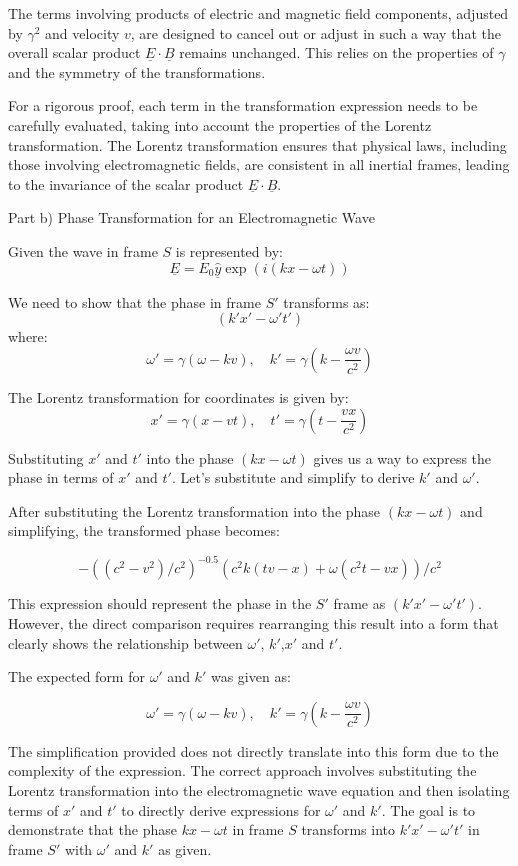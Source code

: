 The terms involving products of electric and magnetic field components, adjusted by \(\gamma^2\) and velocity \(v\), are designed to cancel out or adjust in such a way that the overall scalar product \(\underline{E} \cdot \underline{B}\) remains unchanged. This relies on the properties of \(\gamma\) and the symmetry of the transformations.

For a rigorous proof, each term in the transformation expression needs to be carefully evaluated, taking into account the properties of the Lorentz transformation. The Lorentz transformation ensures that physical laws, including those involving electromagnetic fields, are consistent in all inertial frames, leading to the invariance of the scalar product \(\underline{E} \cdot \underline{B}\).

Part b) Phase Transformation for an Electromagnetic Wave

Given the wave in frame \( S \) is represented by:
\[ \underline{E} = E_{0} \hat{\underline{y}} \exp(i(kx - \omega t)) \]

We need to show that the phase in frame \( S' \) transforms as:
\[ (k'x' - \omega' t') \]
where:
\[ \omega' = \gamma(\omega - kv), \quad k' = \gamma(k - \frac{\omega v}{c^{2}}) \]

The Lorentz transformation for coordinates is given by:
\[ x' = \gamma(x - vt), \quad t' = \gamma(t - \frac{vx}{c^{2}}) \]

Substituting \( x' \) and \( t' \) into the phase \( (kx - \omega t) \) gives us a way to express the phase in terms of \( x' \) and \( t' \). Let's substitute and simplify to derive \( k' \) and \( \omega' \).

After substituting the Lorentz transformation into the phase \( (kx - \omega t) \) and simplifying, the transformed phase becomes:

\[
- ((c^2-v^2)/c^2)^{-0.5}(c^2k(tv-x)+\omega (c^2t -vx))/c^2
\]

This expression should represent the phase in the \(S'\) frame as \( (k'x' - \omega' t') \). However, the direct comparison requires rearranging this result into a form that clearly shows the relationship between \(\omega'\), \(k'\),\(x'\) and \(t'\).

The expected form for \(\omega'\) and \(k'\) was given as:

\[
\omega' = \gamma(\omega-kv), \quad k' = \gamma(k - \frac{\omega v}{c^2})
\]

The simplification provided does not directly translate into this form due to the complexity of the expression. The correct approach involves substituting the Lorentz transformation into the electromagnetic wave equation and then isolating terms of \(x'\) and \(t'\) to directly derive expressions for \(\omega'\) and \(k'\). The goal is to demonstrate that the phase \(kx-\omega t\) in frame \(S\) transforms into \(k'x'-\omega' t'\) in frame \(S'\) with \(\omega'\) and \(k'\) as given.

